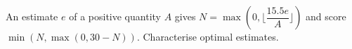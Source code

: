 An estimate $e$ of a positive quantity $A$ gives $N=\max(0,\lfloor\dfrac{15.5e}{A}\rfloor)$ and score $\min(N,\max(0,30-N))$. Characterise optimal estimates.
